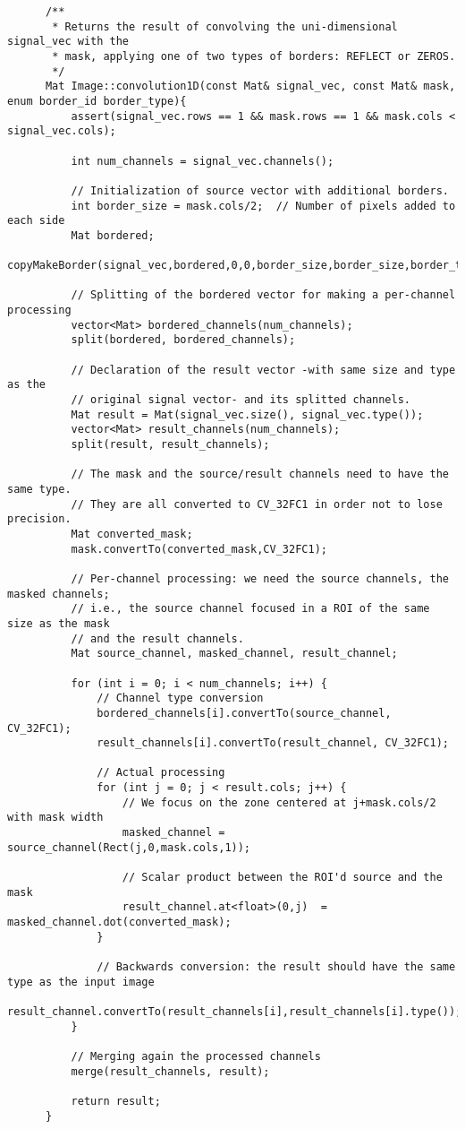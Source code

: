\documentclass[a4paper, 11pt]{article}
\theoremstyle{definition}
\theoremstyle{theorem}
\begin{document}
  \begin{lstlisting}
      /**
       * Returns the result of convolving the uni-dimensional signal_vec with the
       * mask, applying one of two types of borders: REFLECT or ZEROS.
       */
      Mat Image::convolution1D(const Mat& signal_vec, const Mat& mask, enum border_id border_type){
          assert(signal_vec.rows == 1 && mask.rows == 1 && mask.cols < signal_vec.cols);

          int num_channels = signal_vec.channels();

          // Initialization of source vector with additional borders.
          int border_size = mask.cols/2;  // Number of pixels added to each side
          Mat bordered;
          copyMakeBorder(signal_vec,bordered,0,0,border_size,border_size,border_type,0.0);

          // Splitting of the bordered vector for making a per-channel processing
          vector<Mat> bordered_channels(num_channels);
          split(bordered, bordered_channels);

          // Declaration of the result vector -with same size and type as the
          // original signal vector- and its splitted channels.
          Mat result = Mat(signal_vec.size(), signal_vec.type());
          vector<Mat> result_channels(num_channels);
          split(result, result_channels);

          // The mask and the source/result channels need to have the same type.
          // They are all converted to CV_32FC1 in order not to lose precision.
          Mat converted_mask;
          mask.convertTo(converted_mask,CV_32FC1);

          // Per-channel processing: we need the source channels, the masked channels;
          // i.e., the source channel focused in a ROI of the same size as the mask
          // and the result channels.
          Mat source_channel, masked_channel, result_channel;

          for (int i = 0; i < num_channels; i++) {
              // Channel type conversion
              bordered_channels[i].convertTo(source_channel, CV_32FC1);
              result_channels[i].convertTo(result_channel, CV_32FC1);

              // Actual processing
              for (int j = 0; j < result.cols; j++) {
                  // We focus on the zone centered at j+mask.cols/2 with mask width
                  masked_channel = source_channel(Rect(j,0,mask.cols,1));

                  // Scalar product between the ROI'd source and the mask
                  result_channel.at<float>(0,j)  = masked_channel.dot(converted_mask);
              }

              // Backwards conversion: the result should have the same type as the input image
              result_channel.convertTo(result_channels[i],result_channels[i].type());
          }

          // Merging again the processed channels
          merge(result_channels, result);

          return result;
      }
  \end{lstlisting}
\end{document}
